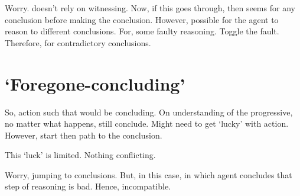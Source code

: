 \begin{note}
  \color{red}
  Worry.
   doesn't rely on witnessing.
  Now, if this goes through, then seems \support{} for any conclusion before making the conclusion.
  However, possible for the agent to reason to different conclusions.
  For, some faulty reasoning.
  Toggle the fault.
  Therefore, \support{} for contradictory conclusions.
\end{note}






\section{`Foregone-concluding'}
\label{sec:fc-progressive}

\begin{note}
  So, action such that would be concluding.
  On understanding of the progressive, no matter what happens, still conclude.
  Might need to get `lucky' with action.
  However, start then path to the conclusion.

  This `luck' is limited.
  Nothing conflicting.
\end{note}

\begin{note}
  Worry, jumping to conclusions.
  But, in this case, \pevent{} in which agent concludes that step of reasoning is bad.
  Hence, incompatible.
\end{note}

